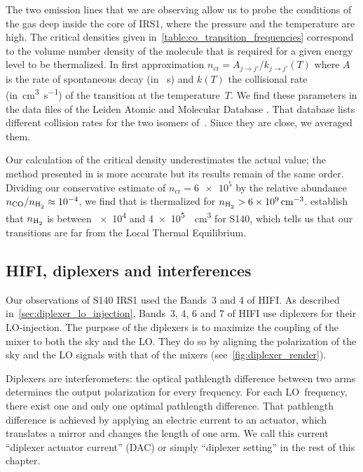 The two emission lines that we are observing allow us to probe the conditions of the gas deep inside the core of IRS1, where the pressure and the temperature are high.
The critical densities given in~\cref{table:co_transition_frequencies} correspond to the volume number density of the molecule that is required for a given energy level to be thermalized.
In first approximation
$n_\text{cr} = A_{j\!\rightarrow\!j'} / k_{j\!\rightarrow\!j'}(T)$
where $A$ is the rate of spontaneous decay (in \si{\per\second})
and $k(T)$ the collisional rate (in~\si{\centi\meter\cubed\per\second})
of the  transition at the temperature~$T$.
We find these parameters in the data files of the Leiden Atomic and Molecular Database \parencite{schoier2004leidenmoldb}.
That database lists different collision rates for the two isomers of~.
Since they are close, we averaged them.

Our calculation of the critical density underestimates the actual value;
the method presented in \textcite{yang2010} is more accurate
but its results remain of the same order.
Dividing our conservative estimate of $n_\text{cr}=\num{6e5}$
by the relative abundance $n_\text{\ce{CO}} / n_\text{\ce{H2}} \approx 10^{-4}$,
we find that  is thermalized for $n_\text{\ce{H2}} > \SI{6e9}{\per\centi\meter\cubed}$.
\Textcite{poelman2006line} establish that $n_\text{\ce{H2}}$ is between \num{e4} and \SI{4e5}{\per\centi\meter\cubed} for S140,
which tells us that our transitions are far from the Local Thermal Equilibrium.



\subsection{HIFI, diplexers and interferences}

Our observations of S140 IRS1 used the Bands~3 and 4 of HIFI.
As described in~\vref{sec:diplexer_lo_injection},
Bands~3, 4, 6 and 7 of HIFI use diplexers for their LO-injection.
The purpose of the diplexers is to maximize the coupling of the mixer to both the sky and the LO.
They do so by aligning the polarization of the sky and the LO signals with that of the mixers (see~\cref{fig:diplexer_render}).

Diplexers are interferometers: the optical pathlength difference between two arms determines the output polarization for every frequency.
For each LO~frequency, there exist one and only one optimal pathlength difference.
That pathlength difference is achieved by applying an electric current to an actuator, which translates a mirror and changes the length of one arm.
We call this current ``diplexer actuator current'' (DAC) or simply ``diplexer setting'' in the rest of this chapter.

